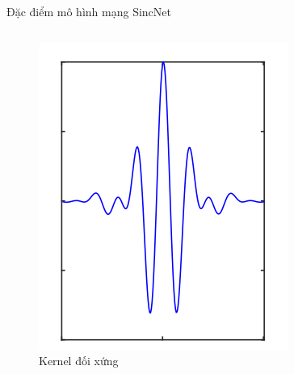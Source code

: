 \documentclass[notheorems, aspectratio=54]{beamer}
\begin{document}
\begin{frame}{Đặc điểm mô hình mạng SincNet}
\begin{columns}
\begin{column}{0.5\textwidth}
\begin{figure}[H]
				\includegraphics[width=0.75\linewidth]{images/g_symmetric.png}
				\caption{Kernel đối xứng}
			\end{figure}
		\end{column}
	\end{columns}
\end{frame}
\end{document}
